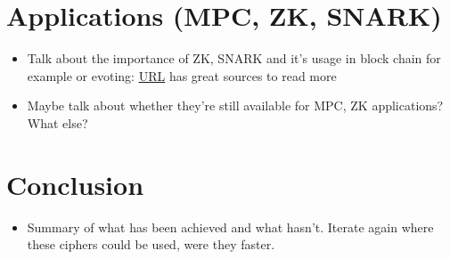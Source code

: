 \documentclass{Resources/UoBLab1}
\theoremstyle{definition}
\begin{document}
\section{Applications (MPC, ZK, SNARK)}
\begin{itemize}
    \item Talk about the importance of ZK, SNARK and it's usage in block chain for example or evoting: \href{https://ethereum.org/en/zero-knowledge-proofs/}{URL} has great sources to read more
    \item Maybe talk about whether they're still available for MPC, ZK applications? What else?
\end{itemize}


\section{Conclusion}
\begin{itemize}
    \item Summary of what has been achieved and what hasn't. Iterate again where these ciphers could be used, were they faster.
\end{itemize}
\end{document}

